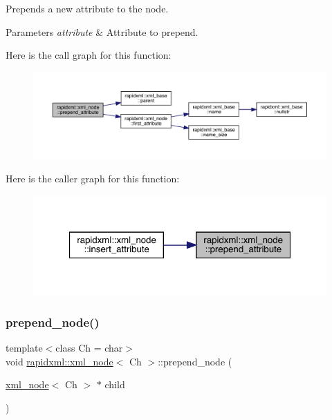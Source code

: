 Prepends a new attribute to the node. 
\begin{DoxyParams}{Parameters}
{\em attribute} & Attribute to prepend. \\
\hline
\end{DoxyParams}
Here is the call graph for this function\+:\nopagebreak
\begin{figure}[H]
\begin{center}
\leavevmode
\includegraphics[width=350pt]{classrapidxml_1_1xml__node_a8b62ee76489faf8e2d1210869d547684_cgraph}
\end{center}
\end{figure}
Here is the caller graph for this function\+:\nopagebreak
\begin{figure}[H]
\begin{center}
\leavevmode
\includegraphics[width=321pt]{classrapidxml_1_1xml__node_a8b62ee76489faf8e2d1210869d547684_icgraph}
\end{center}
\end{figure}
\mbox{\label{classrapidxml_1_1xml__node_ae86e92908c3eab40bbed8216e4f3f3cb}} 
\subsubsection{\texorpdfstring{prepend\_node()}{prepend\_node()}}
{\footnotesize\ttfamily template$<$class Ch = char$>$ \\
void \mbox{\hyperlink{classrapidxml_1_1xml__node}{rapidxml\+::xml\+\_\+node}}$<$ Ch $>$\+::prepend\+\_\+node (\begin{DoxyParamCaption}\item[{\mbox{\hyperlink{classrapidxml_1_1xml__node}{xml\+\_\+node}}$<$ Ch $>$ $\ast$}]{child }\end{DoxyParamCaption})\hspace{0.3cm}{\ttfamily [inline]}}

